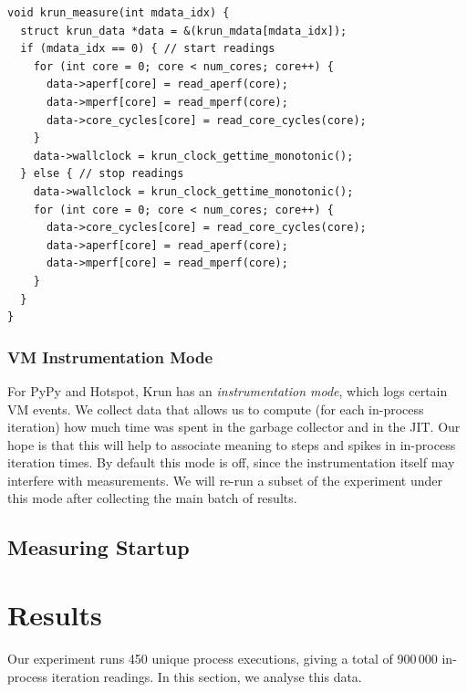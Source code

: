 \documentclass[preprint,numbers,10pt]{sigplanconf}
\newcommand{\krun}{Krun\xspace}
\begin{document}
\begin{lstlisting}[label=lst:krun-measure, xleftmargin=0cm,
        caption={%
\texttt{krun\_measure}: We cannot easily collect the measurements atomically,
so we take the most important reading, wallclock time, innermost. The
\texttt{aperf} and \texttt{mperf} readings will be used to compute a ratio, and
must be collected in the same order both before and after.}]
void krun_measure(int mdata_idx) {
  struct krun_data *data = &(krun_mdata[mdata_idx]);
  if (mdata_idx == 0) { // start readings
    for (int core = 0; core < num_cores; core++) {
      data->aperf[core] = read_aperf(core);
      data->mperf[core] = read_mperf(core);
      data->core_cycles[core] = read_core_cycles(core);
    }
    data->wallclock = krun_clock_gettime_monotonic();
  } else { // stop readings
    data->wallclock = krun_clock_gettime_monotonic();
    for (int core = 0; core < num_cores; core++) {
      data->core_cycles[core] = read_core_cycles(core);
      data->aperf[core] = read_aperf(core);
      data->mperf[core] = read_mperf(core);
    }
  }
}
\end{lstlisting}

\subsubsection{VM Instrumentation Mode}

For PyPy and Hotspot, \krun has an \emph{instrumentation mode}, which logs certain
VM events. We collect data that allows us to compute (for each in-process
iteration) how much time was spent in the garbage collector and in the JIT.
Our hope is that this will help to associate meaning to
steps and spikes in in-process iteration times. By default this mode is off,
since the instrumentation itself may interfere with measurements.
We will re-run a subset of the experiment under this mode after collecting the
main batch of results.

\subsection{Measuring Startup}


\section{Results}
\label{sec:Results}

Our experiment runs 450 unique process
executions, giving a total of 900\,000 in-process iteration readings. 
In this section, we analyse this data.
\end{document}

